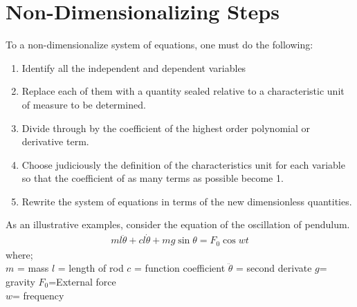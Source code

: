 \documentclass[11pt]{report}
\begin{document}
	\section{Non-Dimensionalizing Steps}
	To a non-dimensionalize system of equations, one must do the following:
	\begin{enumerate}
		\item Identify all the independent and dependent variables
		\item Replace each of them with a quantity sealed relative to a characteristic unit of measure to be determined.
		\item Divide through by the coefficient of the highest order polynomial or derivative term.
		\item Choose judiciously the definition of the characteristics unit for each variable so that the coefficient of as many terms as possible become 1.
		\item Rewrite the system of equations in terms of the new dimensionless quantities.
	\end{enumerate}
	As an illustrative examples, consider the equation of the oscillation of pendulum.
	\begin{eqnarray*}
		ml\ddot{\theta} + cl\dot{\theta} + mg\sin\theta = F_0\cos wt
	\end{eqnarray*}
	where;\\
	\hspace*{0.4cm} $m$ = mass \qquad \hspace*{0.4cm} $l$ = length of rod \qquad \hspace*{0.4cm} $c$ = function coefficient \qquad \hspace*{0.4cm} $\ddot{\theta}$ = second derivate\qquad\hspace*{0.4cm} $g$= gravity \qquad\hspace*{0.4cm} $F_0$=External force\\
	\hspace*{0.4cm} $w$= frequency\\
	
\end{document}
